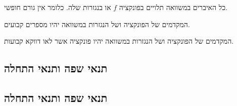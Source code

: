 \documentclass{tstextbook}
\begin{document}
\begin{definition}[מד"ח הומוגני]
כל האיברים במשוואה תלויים בפונקציה \(f\) או בנגזרות שלה. כלומר אין גורם חופשי.

\end{definition}
\begin{definition}
המקדמים של הפונקציה ושל הנגזרות במשוואה יהיו מספרים קבועים.

\end{definition}
\begin{definition}
המקדמים של הפונקציה ושל הנגזרות במשוואה יהיו פונקציה אשר לאו דווקא קבועות.

\end{definition}
\subsection{תנאי שפה ותנאי התחלה}

\subsection{תנאי שפה ותנאי התחלה}
\end{document}
